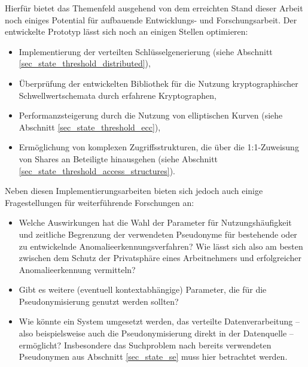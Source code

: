 %

Hierfür bietet das Themenfeld ausgehend von dem erreichten Stand dieser Arbeit noch einiges Potential für aufbauende Entwicklungs- und Forschungsarbeit. Der entwickelte Prototyp lässt sich noch an einigen Stellen optimieren:

\begin{itemize}
  \item Implementierung der verteilten Schlüsselgenerierung (siehe Abschnitt \ref{sec_state_threshold_distributed}),
  \item Überprüfung der entwickelten Bibliothek für die Nutzung kryptographischer Schwellwertschemata durch erfahrene Kryptographen,
  \item Performanzsteigerung durch die Nutzung von elliptischen Kurven (siehe Abschnitt \ref{sec_state_threshold_ecc}),
  \item Ermöglichung von komplexen Zugriffsstrukturen, die über die 1:1-Zuweisung von Shares an Beteiligte hinausgehen (siehe Abschnitt \ref{sec_state_threshold_access_structures}).
\end{itemize}

Neben diesen Implementierungsarbeiten bieten sich jedoch auch einige Fragestellungen für weiterführende Forschungen an:

\begin{itemize}
  \item Welche Auswirkungen hat die Wahl der Parameter für Nutzungshäufigkeit und zeitliche Begrenzung der verwendeten Pseudonyme für bestehende oder zu entwickelnde Anomalieerkennungsverfahren? Wie lässt sich also am besten zwischen dem Schutz der Privatsphäre eines Arbeitnehmers und erfolgreicher Anomalieerkennung vermitteln?
  \item Gibt es weitere (eventuell kontextabhängige) Parameter, die für die Pseudonymisierung genutzt werden sollten?
  \item Wie könnte ein System umgesetzt werden, das verteilte Datenverarbeitung -- also beispielsweise auch die Pseudonymisierung direkt in der Datenquelle -- ermöglicht? Insbesondere das Suchproblem nach bereits verwendeten Pseudonymen aus Abschnitt \ref{sec_state_se} muss hier betrachtet werden.
\end{itemize}


